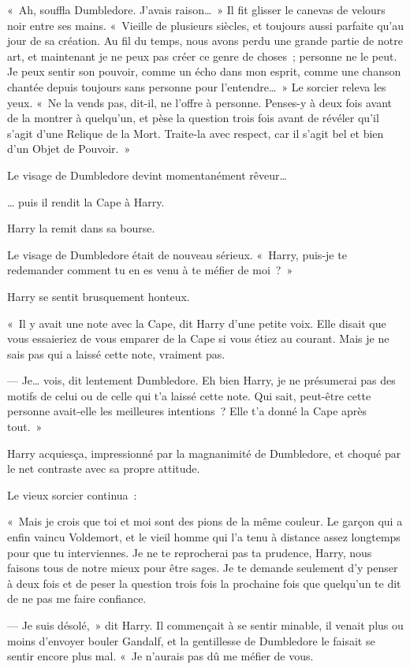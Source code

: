«~Ah, souffla Dumbledore. J'avais raison…~» Il fit glisser le canevas de velours noir entre ses mains. «~Vieille de plusieurs siècles, et toujours aussi parfaite qu'au jour de sa création. Au fil du temps, nous avons perdu une grande partie de notre art, et maintenant je ne peux pas créer ce genre de choses~; personne ne le peut. Je peux sentir son pouvoir, comme un écho dans mon esprit, comme une chanson chantée depuis toujours sans personne pour l'entendre…~» Le sorcier releva les yeux. «~Ne la vends pas, dit-il, ne l'offre à personne. Penses-y à deux fois avant de la montrer à quelqu'un, et pèse la question trois fois avant de révéler qu'il s'agit d'une Relique de la Mort. Traite-la avec respect, car il s'agit bel et bien d'un Objet de Pouvoir.~»

Le visage de Dumbledore devint momentanément rêveur…

… puis il rendit la Cape à Harry.

Harry la remit dans sa bourse.

Le visage de Dumbledore était de nouveau sérieux. «~Harry, puis-je te redemander comment tu en es venu à te méfier de moi~?~»

Harry se sentit brusquement honteux.

«~Il y avait une note avec la Cape, dit Harry d'une petite voix. Elle disait que vous essaieriez de vous emparer de la Cape si vous étiez au courant. Mais je ne sais pas qui a laissé cette note, vraiment pas.

--- Je… vois, dit lentement Dumbledore. Eh bien Harry, je ne présumerai pas des motifs de celui ou de celle qui t'a laissé cette note. Qui sait, peut-être cette personne avait-elle les meilleures intentions~? Elle t'a donné la Cape après tout.~»

Harry acquiesça, impressionné par la magnanimité de Dumbledore, et choqué par le net contraste avec sa propre attitude.

Le vieux sorcier continua~:

«~Mais je crois que toi et moi sont des pions de la même couleur. Le garçon qui a enfin vaincu Voldemort, et le vieil homme qui l'a tenu à distance assez longtemps pour que tu interviennes. Je ne te reprocherai pas ta prudence, Harry, nous faisons tous de notre mieux pour être sages. Je te demande seulement d'y penser à deux fois et de peser la question trois fois la prochaine fois que quelqu'un te dit de ne pas me faire confiance.

--- Je suis désolé,~» dit Harry. Il commençait à se sentir minable, il venait plus ou moins d'envoyer bouler Gandalf, et la gentillesse de Dumbledore le faisait se sentir encore plus mal. «~Je n'aurais pas dû me méfier de vous.

